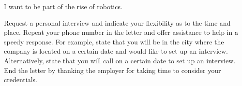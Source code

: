 \documentclass[11pt, a4paper]{awesome-cv}
\begin{document}
\begin{cvletter}
I want to be part of the rise of robotics.








Request a personal interview and indicate your flexibility as to the
time and place. Repeat your phone number in the letter and offer assistance to help in a
speedy response. For example, state that you will be in the city where the company is located
on a certain date and would like to set up an interview. Alternatively, state that you will call
on a certain date to set up an interview. End the letter by thanking the employer for taking
time to consider your credentials.

\end{cvletter}

\makeletterclosing
\end{document}
